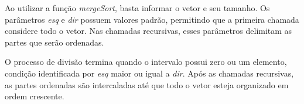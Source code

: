 \quad Ao utilizar a função \textit{mergeSort}, basta informar o vetor
e seu tamanho. Os parâmetros \textit{esq} e \textit{dir} possuem
valores padrão, permitindo que a primeira chamada considere todo o
vetor. Nas chamadas recursivas, esses parâmetros delimitam as partes
que serão ordenadas.

\quad O processo de divisão termina quando o intervalo possui zero
ou um elemento, condição identificada por \textit{esq} maior ou igual
a \textit{dir}. Após as chamadas recursivas, as partes ordenadas são
intercaladas até que todo o vetor esteja organizado em ordem crescente.
